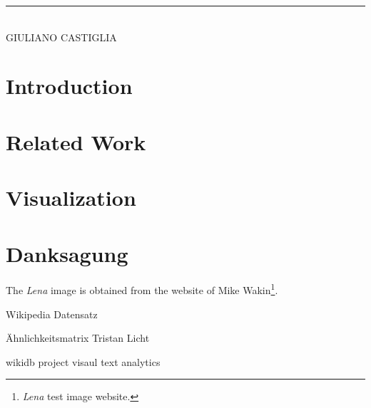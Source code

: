 \vspace{1cm}
\noindent\rule{5cm}{0.4pt}\\
GIULIANO CASTIGLIA

\clearpage



\tableofcontents


\cleardoublepage
{} %

\chapter{Introduction}
\label{chap:introduction}


\chapter{Related Work}


\chapter{Visualization}


\cleardoublepage
\clearpage
%
%


\newpage
\let\cleardoublepage\clearpage
\chapter*{Danksagung}
The \textit{Lena} image is obtained from the website of Mike Wakin\footnote{ \textit{Lena} test image website.}.

Wikipedia Datensatz

Ähnlichkeitsmatrix Tristan Licht

wikidb project visaul text analytics



